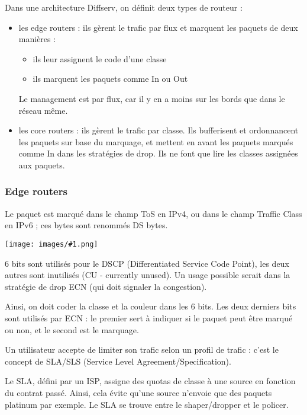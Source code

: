\documentclass[10pt,a4paper]{report}
\newcommand{\dessinS}[2]{\begin{center}\texttt{[image: images/\#1.png]}\end{center}}
\begin{document}
		Dans une architecture Diffserv, on définit deux types de routeur :
		
		\begin{itemize}
			\item les edge routers : ils gèrent le trafic par flux et marquent les paquets de deux manières :
			
			\begin{itemize}
				\item ils leur assignent le code d'une classe
				\item ils marquent les paquets comme In ou Out
			\end{itemize}
			
			Le management est par flux, car il y en a moins sur les bords que dans le réseau même.
			
			\item les core routers : ils gèrent le trafic par classe. Ils bufferisent et ordonnancent les paquets sur base du marquage, et mettent en avant les paquets marqués comme In dans les stratégies de drop. Ils ne font que lire les classes assignées aux paquets.
		\end{itemize}
		
			\subsubsection{Edge routers}
			
			Le paquet est marqué dans le champ ToS en IPv4, ou dans le champ Traffic Class en IPv6 ; ces bytes sont renommés DS bytes.
			
			\dessinS{117}{.65}
			
			6 bits sont utilisés pour le DSCP (Differentiated Service Code Point), les deux autres sont inutilisés (CU - currently unused). Un usage possible serait dans la stratégie de drop ECN (qui doit signaler la congestion).
			
			Ainsi, on doit coder la classe et la couleur dans les 6 bits. Les deux derniers bits sont utilisés par ECN : le premier sert à indiquer si le paquet peut être marqué ou non, et le second est le marquage.
			
			Un utilisateur accepte de limiter son trafic selon un profil de trafic : c'est le concept de SLA/SLS (Service Level Agreement/Specification).
			
			Le SLA, défini par un ISP, assigne des quotas de classe à une source en fonction du contrat passé. Ainsi, cela évite qu'une source n'envoie que des paquets platinum par exemple. Le SLA se trouve entre le shaper/dropper et le policer.
			
\end{document}
